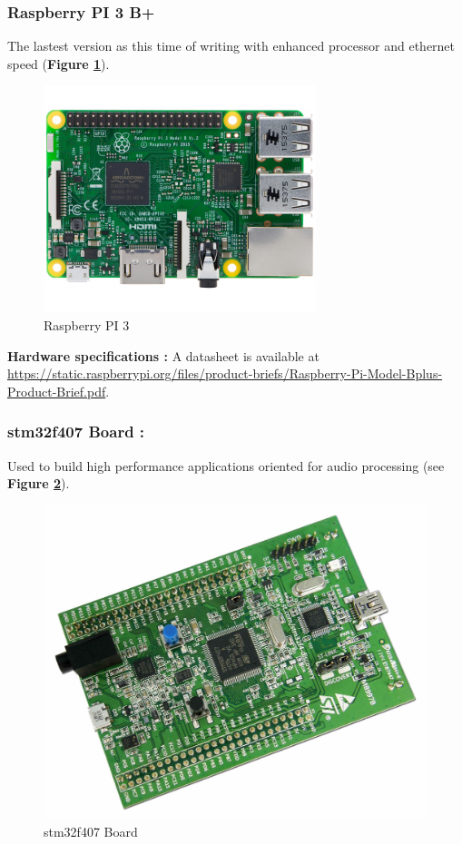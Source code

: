 \subsubsection{Raspberry PI 3 B+}
The lastest version as this time of writing with enhanced processor and ethernet speed (\textbf{Figure \ref{Raspberry PI 3}}).
		\begin{figure}[H]
			\centering
        	\includegraphics[scale=0.32]{img/mean/rpi3.png}
        	\caption{Raspberry PI 3}
        	\label{Raspberry PI 3}
    	\end{figure}
    	
\begin{center}	
\textbf{\color{red}Hardware specifications : } 
A datasheet is available at {\color{blue}\url{https://static.raspberrypi.org/files/product-briefs/Raspberry-Pi-Model-Bplus-Product-Brief.pdf}}.
\end{center}


\subsubsection{stm32f407 Board : } Used to build high performance applications oriented for audio processing (see \textbf{Figure \ref{stm32f407 Board}}).  
		\begin{figure}[H]
			\centering
        	\includegraphics[scale=0.08]{img/mean/stm-32.jpg}
        	\caption{stm32f407 Board}
        	\label{stm32f407 Board}
    	\end{figure}
    	
